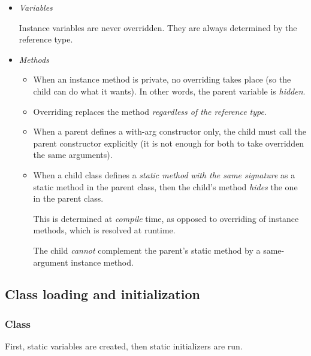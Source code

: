 \documentclass{scrartcl}
\begin{document}
    \begin{itemize}
        \item \textit{Variables}

        Instance variables are never overridden. They are always determined by the reference type.

        \item \textit{Methods}

        \begin{itemize}
            \item
            When an instance method is private, no overriding takes place (so the child can do what it wants). In other words, the parent variable is \textit{hidden}.

             \item
            Overriding replaces the method \textit{regardless of the reference type}.

             \item
            When a parent defines a with-arg constructor only, the child must call the parent constructor
            explicitly (it is not enough for both to take overridden the same arguments).

            \item
            When a child class defines a \textit{static method with the same signature} as a static method in the parent class, then the child’s method \textit{hides} the one in the parent class.

            This is determined at \textit{compile} time, as opposed to overriding of instance methods, which is resolved at runtime.

            The child \textit{cannot} complement the parent's static method
            by a same-argument instance method.
        \end{itemize}



    \end{itemize}

\subsection{Class loading and initialization}
\subsubsection{Class}

    First, static variables are created, then static initializers are run.
\end{document}
